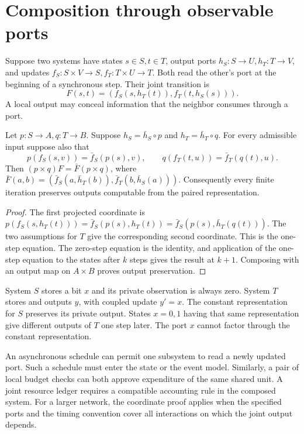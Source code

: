 \section{Composition through observable ports}\label{sec:composition}
Suppose two systems have states $s\in S,t\in T$, output ports $h_S:S\to U,h_T:T\to V$, and updates $f_S:S\times V\to S,f_T:T\times U\to T$. Both read the other's port at the beginning of a synchronous step. Their joint transition is
\[
 F(s,t)=(f_S(s,h_T(t)),f_T(t,h_S(s))).
\]
A local output may conceal information that the neighbor consumes through a port.

\begin{theorem}\label{thm:composition}
Let $p:S\to A,q:T\to B$. Suppose $h_S=\bar h_S\circ p$ and $h_T=\bar h_T\circ q$. For every admissible input suppose also that
\[
p(f_S(s,v))=\bar f_S(p(s),v),\qquad q(f_T(t,u))=\bar f_T(q(t),u).
\]
Then $(p\times q)F=\bar F(p\times q)$, where
$\bar F(a,b)=(\bar f_S(a,\bar h_T(b)),\bar f_T(b,\bar h_S(a)))$.
Consequently every finite iteration preserves outputs computable from the paired representation.
\end{theorem}
\begin{proof}
The first projected coordinate is $p(f_S(s,h_T(t)))=\bar f_S(p(s),h_T(t))=\bar f_S(p(s),\bar h_T(q(t)))$. The two assumptions for $T$ give the corresponding second coordinate. This is the one-step equation. The zero-step equation is the identity, and application of the one-step equation to the states after $k$ steps gives the result at $k+1$. Composing with an output map on $A\times B$ proves output preservation.
\end{proof}

\begin{example}
System $S$ stores a bit $x$ and its private observation is always zero. System $T$ stores and outputs $y$, with coupled update $y'=x$. The constant representation for $S$ preserves its private output. States $x=0,1$ having that same representation give different outputs of $T$ one step later. The port $x$ cannot factor through the constant representation.
\end{example}
An asynchronous schedule can permit one subsystem to read a newly updated port. Such a schedule must enter the state or the event model. Similarly, a pair of local budget checks can both approve expenditure of the same shared unit. A joint resource ledger requires a compatible accounting rule in the composed system. For a larger network, the coordinate proof applies when the specified ports and the timing convention cover all interactions on which the joint output depends.

